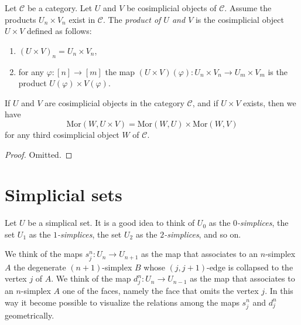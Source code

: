 \begin{definition}
\label{definition-product-cosimplicial-objects}
Let $\mathcal{C}$ be a category.
Let $U$ and $V$ be cosimplicial objects of $\mathcal{C}$.
Assume the products $U_n \times V_n$ exist in $\mathcal{C}$.
The {\it product of $U$ and $V$} is the cosimplicial object
$U\times V$ defined as follows:
\begin{enumerate}
\item $(U \times V)_n = U_n \times V_n$,
\item for any $\varphi : [n] \to [m]$ the map
$(U \times V)(\varphi) : U_n \times V_n \to U_m \times V_m$
is the product $U(\varphi) \times V(\varphi)$.
\end{enumerate}
\end{definition}

\begin{lemma}
\label{lemma-product-cosimplicial-objects}
If $U$ and $V$ are cosimplicial objects in the category $\mathcal{C}$,
and if $U\times V$ exists, then we have
$$
\text{Mor}(W, U\times V) = 
\text{Mor}(W, U) \times
\text{Mor}(W, V)
$$
for any third cosimplicial object $W$ of $\mathcal{C}$.
\end{lemma}

\begin{proof}
Omitted.
\end{proof}


















\section{Simplicial sets}
\label{section-simplicial-set}

\noindent
Let $U$ be a simplical set. It is a good idea to think of
$U_0$ as the {\it $0$-simplices}, the set $U_1$ as the
{\it $1$-simplices},
the set $U_2$ as the {\it $2$-simplices}, and so on.

\medskip\noindent
We think of the maps $s^n_j : U_n \to U_{n + 1}$ as
the map that associates to an $n$-simplex $A$ the degenerate
$(n + 1)$-simplex $B$ whose $(j, j + 1)$-edge is collapsed
to the vertex $j$ of $A$. We think of the map $d^n_j : U_n \to U_{n - 1}$
as the map that associates to an $n$-simplex $A$ one of the
faces, namely the face that omits the vertex $j$.
In this way it become possible to visualize the relations
among the maps $s^n_j$ and $d^n_j$ geometrically.

